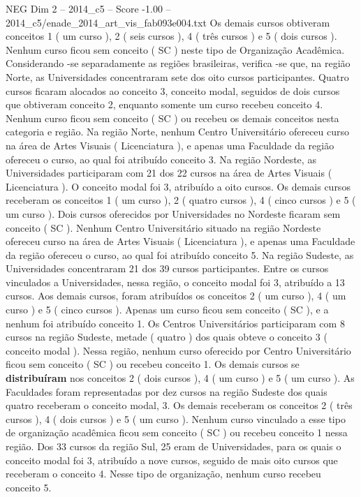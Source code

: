 \begin{textsample}{NEG Dim 2 – 2014\_c5 – Score -1.00 – 2014\_c5/enade\_2014\_art\_vis\_fab093e004.txt}
Os demais cursos obtiveram conceitos 1 ( um curso ), 2 ( seis cursos ), 4 ( três cursos ) e 5 ( dois cursos ).
Nenhum curso ficou sem conceito ( SC ) neste tipo de Organização Acadêmica.
Considerando -se separadamente as regiões brasileiras, verifica -se que, na região Norte, as Universidades concentraram sete dos oito cursos participantes.
Quatro cursos ficaram alocados ao conceito 3, conceito modal, seguidos de dois cursos que obtiveram conceito 2, enquanto somente um curso recebeu conceito 4.
Nenhum curso ficou sem conceito ( SC ) ou recebeu os demais conceitos nesta categoria e região.
Na região Norte, nenhum Centro Universitário ofereceu curso na área de Artes Visuais ( Licenciatura ), e apenas uma Faculdade da região ofereceu o curso, ao qual foi atribuído conceito 3.
Na região Nordeste, as Universidades participaram com 21 dos 22 cursos na área de Artes Visuais ( Licenciatura ).
O conceito modal foi 3, atribuído a oito cursos.
Os demais cursos receberam os conceitos 1 ( um curso ), 2 ( quatro cursos ), 4 ( cinco cursos ) e 5 ( um curso ).
Dois cursos oferecidos por Universidades no Nordeste ficaram sem conceito ( SC ).
Nenhum Centro Universitário situado na região Nordeste ofereceu curso na área de Artes Visuais ( Licenciatura ), e apenas uma Faculdade da região ofereceu o curso, ao qual foi atribuído conceito 5.
Na região Sudeste, as Universidades concentraram 21 dos 39 cursos participantes.
Entre os cursos vinculados a Universidades, nessa região, o conceito modal foi 3, atribuído a 13 cursos.
Aos demais cursos, foram atribuídos os conceitos 2 ( um curso ), 4 ( um curso ) e 5 ( cinco cursos ).
Apenas um curso ficou sem conceito ( SC ), e a nenhum foi atribuído conceito 1.
Os Centros Universitários participaram com 8 cursos na região Sudeste, metade ( quatro ) dos quais obteve o conceito 3 ( conceito modal ).
Nessa região, nenhum curso oferecido por Centro Universitário ficou sem conceito ( SC ) ou recebeu conceito 1.
Os demais cursos se \textbf{distribuíram} nos conceitos 2 ( dois cursos ), 4 ( um curso ) e 5 ( um curso ).
As Faculdades foram representadas por dez cursos na região Sudeste dos quais quatro receberam o conceito modal, 3.
Os demais receberam os conceitos 2 ( três cursos ), 4 ( dois cursos ) e 5 ( um curso ).
Nenhum curso vinculado a esse tipo de organização acadêmica ficou sem conceito ( SC ) ou recebeu conceito 1 nessa região.
Dos 33 cursos da região Sul, 25 eram de Universidades, para os quais o conceito modal foi 3, atribuído a nove cursos, seguido de mais oito cursos que receberam o conceito 4.
Nesse tipo de organização, nenhum curso recebeu conceito 5.

\end{textsample}
